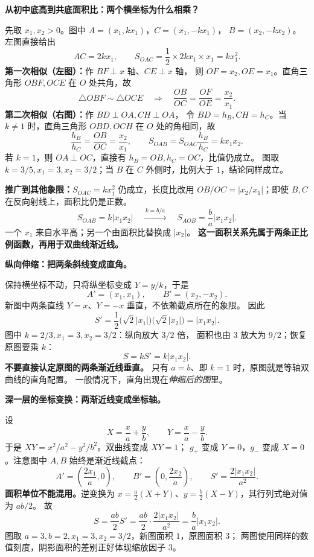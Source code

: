 \clearpage
\begin{explanationbox}
\textbf{从初中底高到共底面积比：两个横坐标为什么相乘？}
\begin{center}\end{center}
先取 $x_1,x_2>0$。图中 $A=(x_1,kx_1)$，$C=(x_1,-kx_1)$，
$B=(x_2,-kx_2)$。左图直接给出
\[
 AC=2kx_1,\qquad S_{OAC}=\frac12\times2kx_1\times x_1=kx_1^2.
\]
\textbf{第一次相似（左图）：}作 $BF\perp x$ 轴、$CE\perp x$ 轴，
则 $OF=x_2,OE=x_1$。直角三角形 $OBF,OCE$ 在 $O$ 处共角，故
\[
 \triangle OBF\sim\triangle OCE
 \quad\Longrightarrow\quad \frac{OB}{OC}=\frac{OF}{OE}=\frac{x_2}{x_1}.
\]
\textbf{第二次相似（右图）：}作 $BD\perp OA,CH\perp OA$，
令 $BD=h_B,CH=h_C$。当 $k\ne1$ 时，直角三角形 $OBD,OCH$ 在 $O$ 处的角相同，故
\[
 \frac{h_B}{h_C}=\frac{OB}{OC}=\frac{x_2}{x_1},\qquad
 S_{OAB}=S_{OAC}\frac{h_B}{h_C}=kx_1x_2.
\]
若 $k=1$，则 $OA\perp OC$，直接有 $h_B=OB,h_C=OC$，比值仍成立。
图取 $k=3/5,x_1=3,x_2=3/2$；当 $B$ 在 $C$ 外侧时，比例大于 $1$，结论同样成立。

\textbf{推广到其他象限：}$S_{OAC}=kx_1^2$ 仍成立，长度比改用
$OB/OC=|x_2/x_1|$；即使 $B,C$ 在反向射线上，面积比仍是正数。
\[
\boxed{S_{OAB}=k|x_1x_2|}\quad\xrightarrow{\ k=b/a\ }\quad
\boxed{S_{AOB}=\frac ba|x_1x_2|}.
\]
一个 $x_1$ 来自水平高；另一个由面积比替换成 $|x_2|$。
\textbf{这一面积关系先属于两条正比例函数，再用于双曲线渐近线。}
\end{explanationbox}

\clearpage
\begin{explanationbox}
\textbf{纵向伸缩：把两条斜线变成直角。}
\begin{center}\end{center}
保持横坐标不动，只将纵坐标变成 $Y=y/k$，于是
\[
 A'=(x_1,x_1),\qquad B'=(x_2,-x_2).
\]
新图中两条直线 $Y=x$、$Y=-x$ 垂直，不依赖截点所在的象限。
因此
\[
 S'=\frac12\bigl(\sqrt2|x_1|\bigr)\bigl(\sqrt2|x_2|\bigr)=|x_1x_2|.
\]
图中 $k=2/3,x_1=3,x_2=3/2$：纵向放大 $3/2$ 倍，
面积也由 $3$ 放大为 $9/2$；恢复原图要乘 $k$：
\[
\boxed{S=kS'=k|x_1x_2|}.
\]
\textbf{不要直接认定原图的两条渐近线垂直。}
只有 $a=b$、即 $k=1$ 时，原图就是等轴双曲线的直角配置。
一般情况下，直角出现在\emph{伸缩后的图}里。
\end{explanationbox}

\clearpage
\begin{explanationbox}
\textbf{深一层的坐标变换：两渐近线变成坐标轴。}
\begin{center}\end{center}
设
\[
 X=\frac xa+\frac yb,\qquad Y=\frac xa-\frac yb.
\]
于是 $XY=x^2/a^2-y^2/b^2$。双曲线变成 $XY=1$；
$g_+$ 变成 $Y=0$，$g_-$ 变成 $X=0$。注意图中 $A,B$ 始终是渐近线截点：
\[
 A'=\left(\frac{2x_1}{a},0\right),\qquad
 B'=\left(0,\frac{2x_2}{a}\right),\qquad
 S'=\frac{2|x_1x_2|}{a^2}.
\]
\textbf{面积单位不能混用。}逆变换为
$x=\tfrac a2(X+Y)$、$y=\tfrac b2(X-Y)$，其行列式绝对值为 $ab/2$。
故
\[
 S=\frac{ab}{2}S'=\frac{ab}{2}\cdot\frac{2|x_1x_2|}{a^2}
 =\boxed{\frac ba|x_1x_2|}.
\]
图取 $a=3,b=2,x_1=3,x_2=3/2$，新图面积 $1$，原图面积 $3$；
两图使用同样的数值刻度，阴影面积的差别正好体现缩放因子 $3$。
\end{explanationbox}

